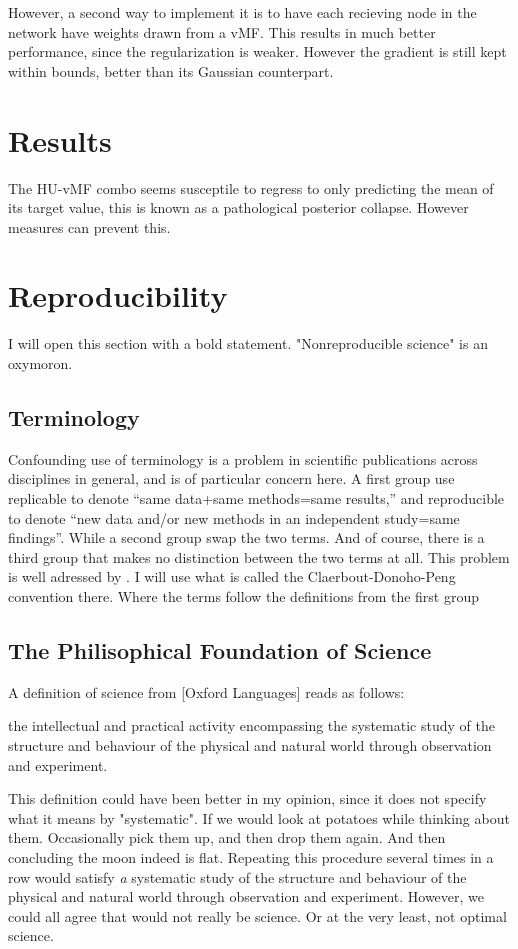 \documentclass[nofootinbib,UKenglish,nobalancelastpage,12pt]{article}
\begin{document}
However, a second way to implement it is to have each recieving node in the network have weights drawn from a vMF. This results in much better performance, since the regularization is weaker. However the gradient is still kept within bounds, better than its Gaussian counterpart.

\section{Results}

The HU-vMF combo seems susceptile to regress to only predicting the mean of its target value, this is known as a pathological posterior collapse. However measures can prevent this.

\section{Reproducibility}

I will open this section with a bold statement. "Nonreproducible science" is an oxymoron. 

\subsection{Terminology}

Confounding use of terminology is a problem in scientific publications across disciplines in general, and is of particular concern here.
A first group use replicable to denote  “same data+same methods=same results,” and reproducible to denote “new data and/or new methods in an independent study=same findings”. While a second group swap the two terms. And of course, there is a third group that makes no distinction between the two terms at all. This problem is well adressed by \cite{Barba_2018}. I will use what is  called the Claerbout-Donoho-Peng convention there. Where the terms follow the definitions from the first group

\subsection{The Philisophical Foundation of Science}

A definition of science from [Oxford Languages] reads as follows:

the intellectual and practical activity encompassing the systematic study of the structure and behaviour of the physical and natural world through observation and experiment. 

This definition could have been better in my opinion, since it does not specify what it means by "systematic". If we would look at potatoes while thinking about them. Occasionally pick them up, and then drop them again. And then concluding the moon indeed is flat. Repeating this procedure several times in a row would satisfy \textit{a} systematic study of the structure and behaviour of the physical and natural world through observation and experiment. However, we could all agree that would not really be science. Or at the very least, not optimal science.
\end{document}
